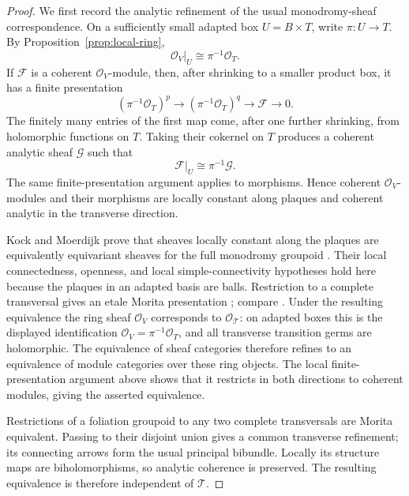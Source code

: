 \documentclass[12pt]{amsart}
\theoremstyle{definition}
\theoremstyle{remark}
\numberwithin{equation}{section}
\newcommand{\CO}{\mathcal O}
\begin{document}
\begin{proof}
We first record the analytic refinement of the usual monodromy-sheaf
correspondence.  On a sufficiently small adapted box
\(U=B\times T\), write \(\pi:U\to T\).  By
Proposition~\ref{prop:local-ring},
\[
\CO_V|_U\cong\pi^{-1}\CO_T.
\]
If \(\mathcal F\) is a coherent \(\CO_V\)-module, then, after shrinking to a
smaller product box, it has a finite presentation
\[
(\pi^{-1}\CO_T)^p
\longrightarrow
(\pi^{-1}\CO_T)^q
\longrightarrow
\mathcal F
\longrightarrow0.
\]
The finitely many entries of the first map come, after one further
shrinking, from holomorphic functions on \(T\).  Taking their cokernel on
\(T\) produces a coherent analytic sheaf \(\mathcal G\) such that
\[
\mathcal F|_U\cong\pi^{-1}\mathcal G.
\]
The same finite-presentation argument applies to morphisms.  Hence coherent
\(\CO_V\)-modules and their morphisms are locally constant along plaques and
coherent analytic in the transverse direction.

Kock and Moerdijk prove that sheaves locally constant along the plaques are
equivalently equivariant sheaves for the full monodromy groupoid
\cite[Theorems~2.8 and 3.6]{KockMoerdijk1996}.  Their local connectedness,
openness, and local simple-connectivity hypotheses hold here because the
plaques in an adapted basis are balls.  Restriction to a complete
transversal gives an etale Morita presentation
\cite[Theorem~4.1 and Corollary~4.2]{KockMoerdijk1996}; compare
\cite[Section~1]{CrainicMoerdijk2001}.  Under the resulting equivalence the
ring sheaf \(\CO_V\) corresponds to \(\CO_{\mathcal T}\): on adapted boxes
this is the displayed identification
\(\CO_V=\pi^{-1}\CO_T\), and all transverse transition germs are
holomorphic.  The equivalence of sheaf categories therefore refines to an
equivalence of module categories over these ring objects.  The local
finite-presentation argument above shows that it restricts in both
directions to coherent modules, giving the asserted equivalence.

Restrictions of a foliation groupoid to any two complete transversals are
Morita equivalent.  Passing to their disjoint union gives a common
transverse refinement; its connecting arrows form the usual principal
bibundle.  Locally its structure maps are biholomorphisms, so analytic
coherence is preserved.  The resulting equivalence is therefore independent
of \(\mathcal T\).
\end{proof}
\end{document}
